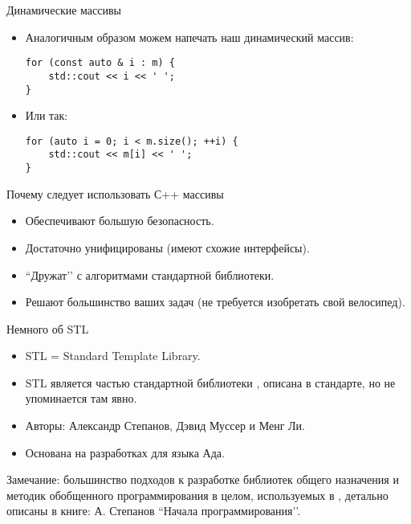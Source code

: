 \documentclass{beamer}
\begin{document}
\begin{frame}[fragile]{Динамические массивы}
    \begin{itemize}
    \item Аналогичным образом можем напечать наш динамический массив:
        \begin{lstlisting}
for (const auto & i : m) {
    std::cout << i << ' '; 
}
        \end{lstlisting}
    \item Или так:
        \begin{lstlisting}
for (auto i = 0; i < m.size(); ++i) {
    std::cout << m[i] << ' '; 
}
        \end{lstlisting}
    \end{itemize}
\end{frame}

\begin{frame}[fragile]{Почему следует использовать С++ массивы}
    \begin{itemize}
        \item Обеспечивают большую безопасность.
        \item Достаточно унифицированы (имеют схожие интерфейсы).
        \item ``Дружат’’ с алгоритмами стандартной библиотеки.
        \item Решают большинство ваших задач (не требуется изобретать свой велосипед).
    \end{itemize}
\end{frame}

\begin{frame}{Немного об STL}
    \begin{itemize}
        \item STL = Standard Template Library.
        \item STL является частью стандартной библиотеки \langcpp, описана в стандарте, но не упоминается там явно.
        \item Авторы: Александр Степанов, Дэвид Муссер и Менг Ли.
        \item Основана на разработках для языка Ада.
    \end{itemize}
    Замечание: большинство подходов к разработке библиотек общего назначения и методик обобщенного программирования в целом, 
        используемых в \langcpp, детально описаны в книге: А. Степанов ``Начала программирования’’.
\end{frame}
\end{document}
